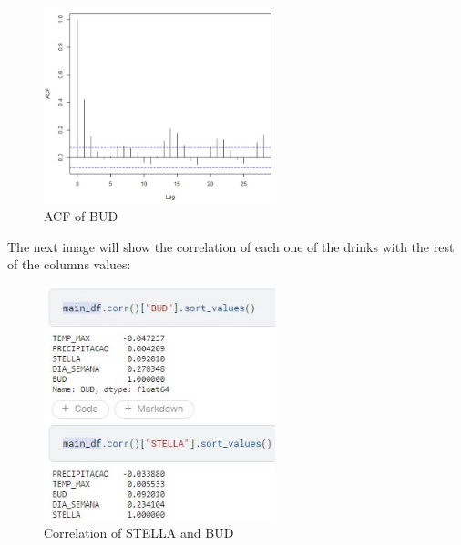     \begin{figure}[H]
            \centering
            \includegraphics[width=0.6\textwidth]{assets/ACF BUD.jpeg}
            \caption{ACF of BUD}
            \label{fig:stella_outliers}
            \end{figure}



The next image will show the correlation of each one of the drinks with the rest of the columns values:\\

\begin{figure}[H]
    \centering
    \includegraphics[width=0.6\textwidth]{assets/autocorrelação.jpeg}
    \caption{Correlation of STELLA and BUD}
    \label{fig:stella_outliers}
    \end{figure}
